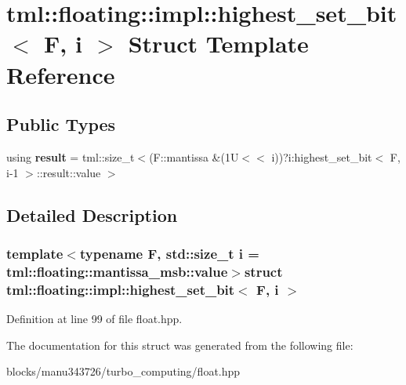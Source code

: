 \hypertarget{structtml_1_1floating_1_1impl_1_1highest__set__bit}{\section{tml\+:\+:floating\+:\+:impl\+:\+:highest\+\_\+set\+\_\+bit$<$ F, i $>$ Struct Template Reference}
\label{structtml_1_1floating_1_1impl_1_1highest__set__bit}
}
\subsection*{Public Types}
\begin{DoxyCompactItemize}
\item 
\hypertarget{structtml_1_1floating_1_1impl_1_1highest__set__bit_adc369c60e749638eb24094c9b2169634}{using {\bfseries result} = tml\+::size\+\_\+t$<$(F\+::mantissa \&(1\+U$<$$<$ i))?i\+:highest\+\_\+set\+\_\+bit$<$ F, i-\/1 $>$\+::result\+::value $>$}\label{structtml_1_1floating_1_1impl_1_1highest__set__bit_adc369c60e749638eb24094c9b2169634}

\end{DoxyCompactItemize}


\subsection{Detailed Description}
\subsubsection*{template$<$typename F, std\+::size\+\_\+t i = tml\+::floating\+::mantissa\+\_\+msb\+::value$>$struct tml\+::floating\+::impl\+::highest\+\_\+set\+\_\+bit$<$ F, i $>$}



Definition at line 99 of file float.\+hpp.



The documentation for this struct was generated from the following file\+:\begin{DoxyCompactItemize}
\item 
blocks/manu343726/turbo\+\_\+computing/float.\+hpp\end{DoxyCompactItemize}
